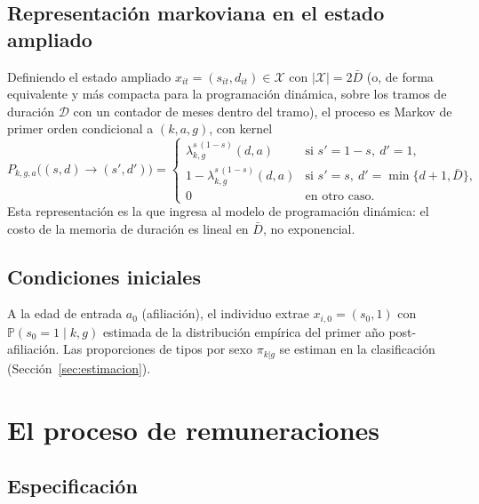 \documentclass[11pt]{article}
\newcommand{\Prob}{\mathbb{P}}
\begin{document}
\subsection{Representación markoviana en el estado ampliado}

Definiendo el estado ampliado $x_{it} = (s_{it}, d_{it}) \in \mathcal{X}$ con
$|\mathcal{X}| = 2\bar D$ (o, de forma equivalente y más compacta para la
programación dinámica, sobre los tramos de duración $\mathcal{D}$ con un
contador de meses dentro del tramo), el proceso es Markov de primer orden
condicional a $(k, a, g)$, con kernel
\begin{equation}
P_{k,g,a}\bigl((s,d) \to (s', d')\bigr) =
\begin{cases}
\lambda^{s\,(1-s)}_{k,g}(d,a) & \text{si } s' = 1-s,\ d' = 1,\\[2pt]
1 - \lambda^{s\,(1-s)}_{k,g}(d,a) & \text{si } s' = s,\ d' = \min\{d+1,\bar D\},\\[2pt]
0 & \text{en otro caso.}
\end{cases}
\label{eq:kernel}
\end{equation}
Esta representación es la que ingresa al modelo de programación dinámica: el
costo de la memoria de duración es lineal en $\bar D$, no exponencial.

\subsection{Condiciones iniciales}

A la edad de entrada $a_0$ (afiliación), el individuo extrae
$x_{i,0} = (s_0, 1)$ con $\Prob(s_0 = 1 \mid k, g)$ estimada de la
distribución empírica del primer año post-afiliación. Las proporciones de
tipos por sexo $\pi_{k|g}$ se estiman en la clasificación
(Sección~\ref{sec:estimacion}).

\section{El proceso de remuneraciones}

\subsection{Especificación}
\end{document}
